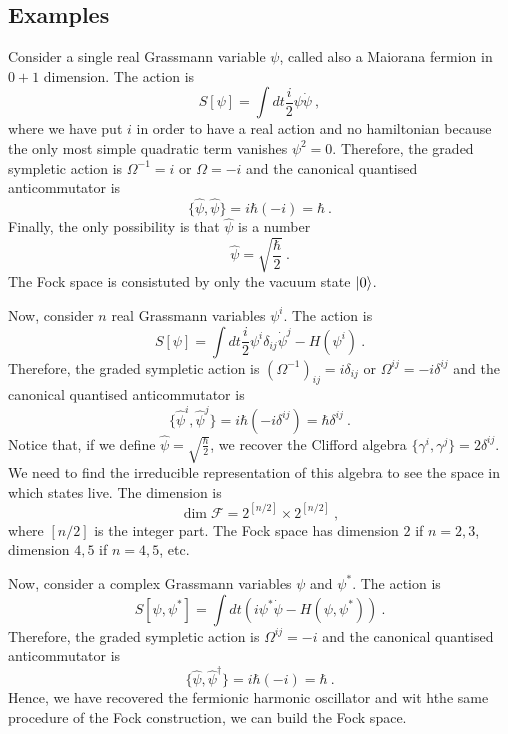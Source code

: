 \subsection{Examples}

    Consider a single real Grassmann variable $\psi$, called also a Maiorana fermion in $0 + 1$ dimension. The action is 
    \begin{equation*}
        S[\psi] = \int dt \frac{i}{2} \psi \dot \psi ~,
    \end{equation*}
    where we have put $i$ in order to have a real action and no hamiltonian because the only most simple quadratic term vanishes $\psi^2 = 0$. Therefore, the graded sympletic action is $\Omega^{-1} = i$ or $\Omega = -i$ and the canonical quantised anticommutator is 
    \begin{equation*}
        \{\hat \psi, \hat \psi\} = i \hbar (-i) = \hbar ~.
    \end{equation*}
    Finally, the only possibility is that $\hat \psi$ is a number
    \begin{equation*}
        \hat \psi = \sqrt{\frac{\hbar}{2}} ~.
    \end{equation*}
    The Fock space is consistuted by only the vacuum state $\vert0\rangle$. 

    Now, consider $n$ real Grassmann variables $\psi^i$. The action is 
    \begin{equation*}
        S[\psi] = \int dt \frac{i}{2} \psi^i \delta_{ij} \dot \psi^j - H(\psi^i) ~.
    \end{equation*}
    Therefore, the graded sympletic action is $(\Omega^{-1})_{ij} = i \delta_{ij}$ or $\Omega^{ij} = -i \delta^{ij}$ and the canonical quantised anticommutator is 
    \begin{equation*}
        \{\hat \psi^i, \hat \psi^j\} = i \hbar (-i \delta^{ij}) = \hbar \delta^{ij} ~.
    \end{equation*}
    Notice that, if we define $\hat \psi = \sqrt{\frac{\hbar}{2}}$, we recover the Clifford algebra $\{\gamma^i, \gamma^j\} = 2 \delta^{ij}$. We need to find the irreducible representation of this algebra to see the space in which states live. The dimension is
    \begin{equation*}
        \dim \mathcal F = 2^{[n/2]} \times 2^{[n/2]} ~,
    \end{equation*}
    where $[n/2]$ is the integer part. The Fock space has dimension $2$ if $n=2,3$, dimension $4,5$ if $n = 4,5$, etc.

    Now, consider a complex Grassmann variables $\psi$ and $\psi^*$. The action is 
    \begin{equation*}
        S[\psi, \psi^*] = \int dt (i \psi^* \dot \psi - H(\psi, \psi^*)) ~.
    \end{equation*}
    Therefore, the graded sympletic action is $\Omega^{ij} = -i$ and the canonical quantised anticommutator is 
    \begin{equation*}
        \{\hat \psi, \hat \psi^\dagger \} = i \hbar (-i) = \hbar ~.
    \end{equation*}
    Hence, we have recovered the fermionic harmonic oscillator and wit hthe same procedure of the Fock construction, we can build the Fock space.


